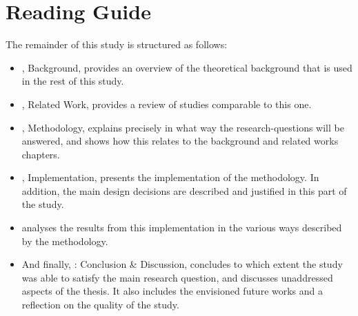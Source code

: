 \newpage
\section{Reading Guide}
The remainder of this study is structured as follows:

\begin{itemize}[ ]
  \item {}, Background, provides an overview of the theoretical background that is used in the rest of this study.
  
  \item {}, Related Work, provides a review of studies comparable to this one.

  \item {}, Methodology, explains precisely in what way the research-questions will be answered, and shows how this relates to the background and related works chapters. 

  \item {}, Implementation, presents the implementation of the methodology.
  In addition, the main design decisions are described and justified in this part of the study.
  
  \item {} analyses the results from this implementation in the various ways described by the methodology.
  
  \item And finally, : Conclusion \& Discussion, concludes to which extent the study was able to satisfy the main research question, and discusses unaddressed aspects of the thesis.
  It also includes the envisioned future works and a reflection on the quality of the study.

\end{itemize}